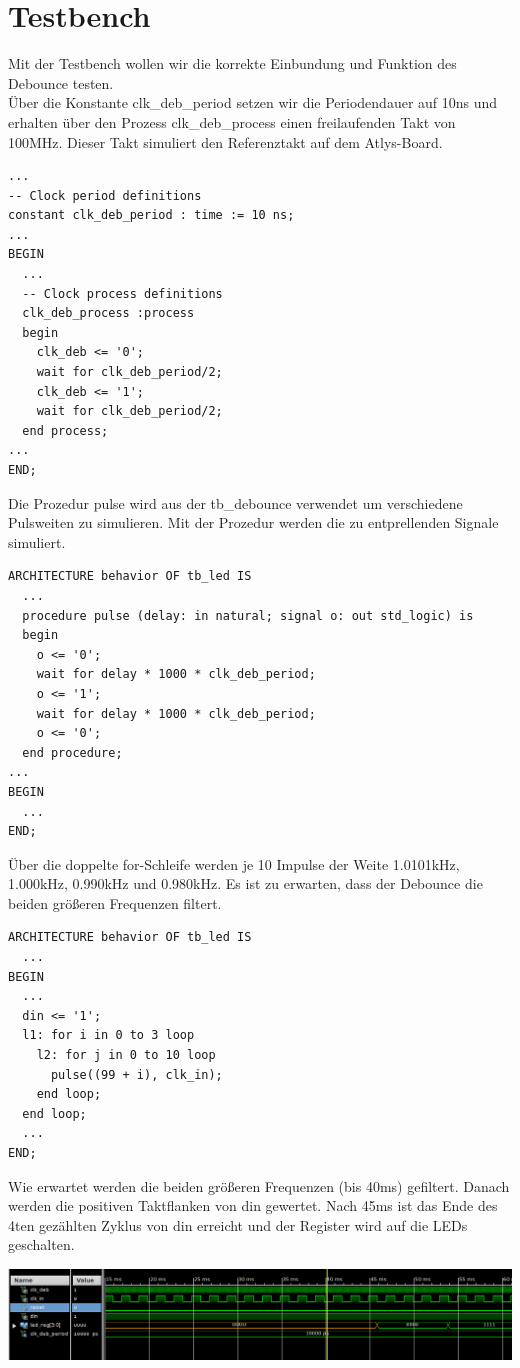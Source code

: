 \documentclass{article}
\newcommand{\enterProblemHeader}[1]{
}
\newcommand{\exitProblemHeader}[1]{
}
\newcounter{homeworkProblemCounter} %
\newcommand{\homeworkProblemName}{}
\newenvironment{homeworkProblem}[1][Problem \arabic{homeworkProblemCounter}]{ %
\stepcounter{homeworkProblemCounter} %
\renewcommand{\homeworkProblemName}{#1} %
\section{\homeworkProblemName} %
\enterProblemHeader{\homeworkProblemName} %
}{
\exitProblemHeader{\homeworkProblemName} %
}
\begin{document}
\begin{homeworkProblem}[Testbench]
Mit der Testbench wollen wir die korrekte Einbundung und Funktion des Debounce testen.
\\
Über die Konstante clk\_deb\_period setzen wir die Periodendauer auf 10ns und erhalten
über den Prozess clk\_deb\_process einen freilaufenden Takt von 100MHz. Dieser Takt
simuliert den Referenztakt auf dem Atlys-Board. 
\begin{verbatim}
...
-- Clock period definitions
constant clk_deb_period : time := 10 ns;
...
BEGIN
  ...
  -- Clock process definitions
  clk_deb_process :process
  begin
    clk_deb <= '0';
    wait for clk_deb_period/2;
    clk_deb <= '1';
    wait for clk_deb_period/2;
  end process;
...
END;
\end{verbatim}
Die Prozedur pulse wird aus der tb\_debounce verwendet um verschiedene Pulsweiten zu 
simulieren. Mit der Prozedur werden die zu entprellenden Signale simuliert.
\begin{verbatim}
ARCHITECTURE behavior OF tb_led IS 
  ...
  procedure pulse (delay: in natural; signal o: out std_logic) is
  begin
    o <= '0';
    wait for delay * 1000 * clk_deb_period;
    o <= '1';
    wait for delay * 1000 * clk_deb_period;
    o <= '0';
  end procedure;
...
BEGIN
  ...
END;
\end{verbatim}
Über die doppelte for-Schleife werden je 10 Impulse der Weite 1.0101kHz, 1.000kHz,
0.990kHz und 0.980kHz. Es ist zu erwarten, dass der Debounce die beiden größeren
Frequenzen filtert.
\begin{verbatim}
ARCHITECTURE behavior OF tb_led IS 
  ...
BEGIN
  ...
  din <= '1';
  l1: for i in 0 to 3 loop
    l2: for j in 0 to 10 loop
      pulse((99 + i), clk_in); 
    end loop;
  end loop;
  ...
END;
\end{verbatim}
Wie erwartet werden die beiden größeren Frequenzen (bis 40ms) gefiltert. Danach
werden die positiven Taktflanken von din gewertet.
Nach 45ms ist das Ende des 4ten gezählten Zyklus von din erreicht und der
Register wird auf die LEDs geschalten.
\begin{center}
\includegraphics[width=1\columnwidth]{sim}
\end{center}
\end{homeworkProblem}
\clearpage
\end{document}
